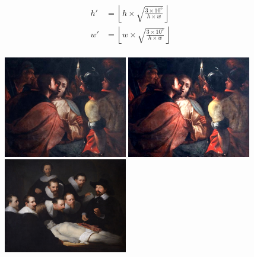 \documentclass[11pt,a4paper,twoside,openright,draft]{report}
\begin{document}
\begin{multicols}{2}
%
%

\begin{equation}
\begin{aligned}
h'  &= \left\lfloor h \times
                    \sqrt{ \frac{3 \times 10^5}{h \times w} } \right\rfloor \\
w'  &= \left\lfloor w \times
                    \sqrt{ \frac{3 \times 10^5}{h \times w} } \right\rfloor \\
\label{eq:size}
\end{aligned}
\end{equation}

\begin{figure}[tbp]
\centering
\includegraphics[width=0.48\textwidth]{nirp_caravaggio_1962_139_1}
\includegraphics[width=0.48\textwidth]{caravaggio_1962_139_1}
\includegraphics[width=0.48\textwidth]{nirp_rembrandt_eu_464}

\end{figure}
\end{multicols}
\end{document}
